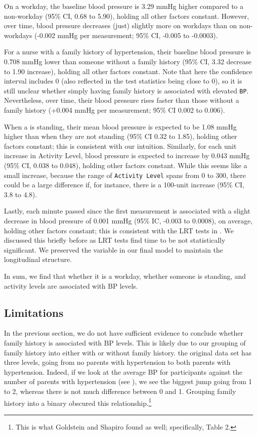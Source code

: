\documentclass[12pt,twoside,letterpaper]{article}
\theoremstyle{definition}
\theoremstyle{definition}
\begin{document}
On a workday, the baseline blood pressure is 3.29 mmHg higher compared to a non-workday (95\% CI, 0.68 to 5.90), holding all other factors constant. However, over time, blood pressure decreases (just) slightly more on workdays than on non-workdays (-0.002 mmHg per measurement; 95\% CI, -0.005 to -0.0003).

For a nurse with a family history of hypertension, their baseline blood pressure is 0.708 mmHg lower than someone without a family history (95\% CI, 3.32 decrease to 1.90 increase), holding all other factors constant. Note that here the confidence interval includes 0 (also reflected in the test statistics being close to 0), so it is still unclear whether simply having family history is associated with elevated \texttt{BP}. Nevertheless, over time, their blood pressure rises faster than those without a family history (+0.004 mmHg per measurement; 95\% CI 0.002 to 0.006).

When a is standing, their mean blood pressure is expected to be 1.08 mmHg higher than when they are not standing (95\% CI 0.32 to 1.85), holding other factors constant; this is consistent with our intuition. Similarly, for each unit increase in Activity Level, blood pressure is expected to increase by 0.043 mmHg (95\% CI, 0.038 to 0.048), holding other factors constant. While this seems like a small increase, because the range of \texttt{Activity Level} spans from 0 to 300, there could be a large difference if, for instance, there is a 100-unit increase (95\% CI, 3.8 to 4.8).

Lastly, each minute passed since the first measurement is associated with a slight decrease in blood pressure of 0.001 mmHg (95\% IC, -0.003 to 0.0008), on average, holding other factors constant; this is consistent with the LRT tests in . We discussed this briefly before as LRT tests find time to be not statistically significant. We preserved the variable in our final model to maintain the longitudinal structure. 

In sum, we find that whether it is a workday, whether someone is standing, and activity levels are associated with BP levels.

\subsection{Limitations}

In the previous section, we do not have sufficient evidence to conclude whether family history is associated with BP levels. This is likely due to our grouping of family history into either with or without family history. the original data set has three levels, going from no parents with hypertension to both parents with hypertension. Indeed, if we look at the average BP for participants against the number of parents with hypertension (see ), we see the biggest jump going from 1 to 2, whereas there is not much difference between 0 and 1. Grouping family history into a binary obscured this relationship.\footnote{This is what Goldstein and Shapiro  found as well; specifically, Table 2.}
\end{document}
